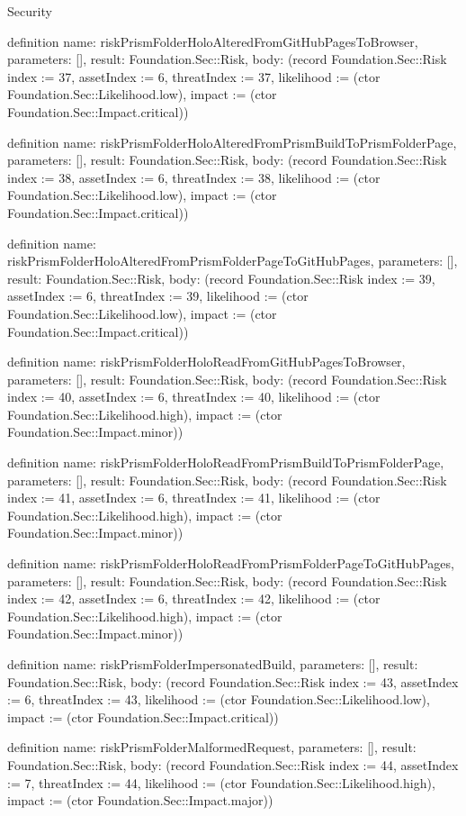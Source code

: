 \begin{lexlean}{Security}
\begin{semanticmodule}
definition{
  name: riskPrismFolderHoloAlteredFromGitHubPagesToBrowser,
  parameters: [],
  result: Foundation.Sec::Risk,
  body: (record Foundation.Sec::Risk {index := 37, assetIndex := 6, threatIndex := 37, likelihood := (ctor Foundation.Sec::Likelihood.low), impact := (ctor Foundation.Sec::Impact.critical)})
}

definition{
  name: riskPrismFolderHoloAlteredFromPrismBuildToPrismFolderPage,
  parameters: [],
  result: Foundation.Sec::Risk,
  body: (record Foundation.Sec::Risk {index := 38, assetIndex := 6, threatIndex := 38, likelihood := (ctor Foundation.Sec::Likelihood.low), impact := (ctor Foundation.Sec::Impact.critical)})
}

definition{
  name: riskPrismFolderHoloAlteredFromPrismFolderPageToGitHubPages,
  parameters: [],
  result: Foundation.Sec::Risk,
  body: (record Foundation.Sec::Risk {index := 39, assetIndex := 6, threatIndex := 39, likelihood := (ctor Foundation.Sec::Likelihood.low), impact := (ctor Foundation.Sec::Impact.critical)})
}

definition{
  name: riskPrismFolderHoloReadFromGitHubPagesToBrowser,
  parameters: [],
  result: Foundation.Sec::Risk,
  body: (record Foundation.Sec::Risk {index := 40, assetIndex := 6, threatIndex := 40, likelihood := (ctor Foundation.Sec::Likelihood.high), impact := (ctor Foundation.Sec::Impact.minor)})
}

definition{
  name: riskPrismFolderHoloReadFromPrismBuildToPrismFolderPage,
  parameters: [],
  result: Foundation.Sec::Risk,
  body: (record Foundation.Sec::Risk {index := 41, assetIndex := 6, threatIndex := 41, likelihood := (ctor Foundation.Sec::Likelihood.high), impact := (ctor Foundation.Sec::Impact.minor)})
}

definition{
  name: riskPrismFolderHoloReadFromPrismFolderPageToGitHubPages,
  parameters: [],
  result: Foundation.Sec::Risk,
  body: (record Foundation.Sec::Risk {index := 42, assetIndex := 6, threatIndex := 42, likelihood := (ctor Foundation.Sec::Likelihood.high), impact := (ctor Foundation.Sec::Impact.minor)})
}

definition{
  name: riskPrismFolderImpersonatedBuild,
  parameters: [],
  result: Foundation.Sec::Risk,
  body: (record Foundation.Sec::Risk {index := 43, assetIndex := 6, threatIndex := 43, likelihood := (ctor Foundation.Sec::Likelihood.low), impact := (ctor Foundation.Sec::Impact.critical)})
}

definition{
  name: riskPrismFolderMalformedRequest,
  parameters: [],
  result: Foundation.Sec::Risk,
  body: (record Foundation.Sec::Risk {index := 44, assetIndex := 7, threatIndex := 44, likelihood := (ctor Foundation.Sec::Likelihood.high), impact := (ctor Foundation.Sec::Impact.major)})
}


\end{semanticmodule}
\end{lexlean}
